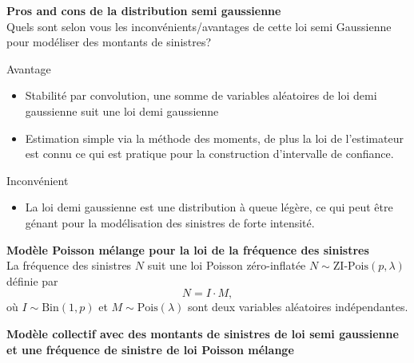 \documentclass[11pt,addpoints,answers]{exam}
\newcommand{\E}{\mathbb E}            %
\def\V{\operatorname{Var}}
\begin{document}
\begin{questions}
\question[2] \textbf{Pros and cons de la distribution semi gaussienne}\\
Quels sont selon vous les inconvénients/avantages de cette loi semi Gaussienne pour modéliser des montants de sinistres?
\begin{solution}
Avantage
\begin{itemize}
	\item Stabilité par convolution, une somme de variables aléatoires de loi demi gaussienne suit une loi demi gaussienne
	\item Estimation simple via la méthode des moments, de plus la loi de l'estimateur est connu ce qui est pratique pour la construction d'intervalle de confiance.  
\end{itemize}
Inconvénient
\begin{itemize}
	\item La loi demi gaussienne est une distribution à queue légère, ce qui peut être génant pour la modélisation des sinistres de forte intensité.
\end{itemize}
\end{solution}
\question \textbf{Modèle Poisson mélange pour la loi de la fréquence des sinistres}\\
La fréquence des sinistres $N$ suit une loi Poisson zéro-inflatée $N\sim\text{ZI-Pois}(p,\lambda)$ définie par
$$
N = I\cdot M,
$$
où $I\sim\text{Bin}(1, p)$ et $M\sim\text{Pois}(\lambda)$ sont deux variables aléatoires indépendantes. 
\question \textbf{Modèle collectif avec des montants de sinistres de loi semi gaussienne et une fréquence de sinistre de loi Poisson mélange}\\


\end{questions}
\end{document}
